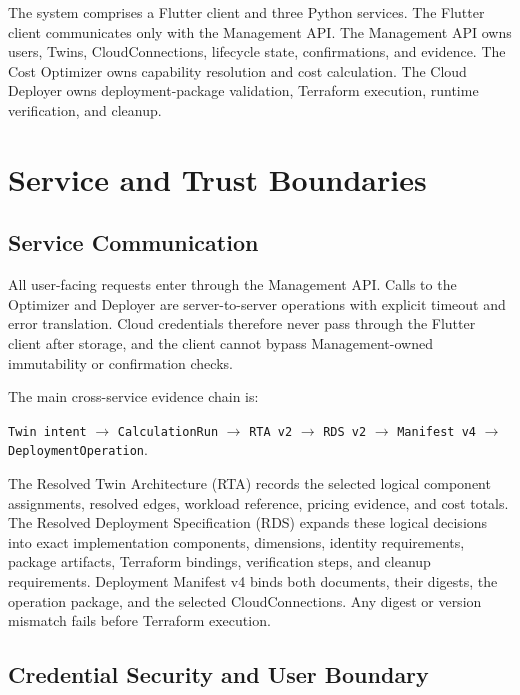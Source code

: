 The system comprises a Flutter client and three Python services. The Flutter
client communicates only with the Management API. The Management API owns
users, Twins, CloudConnections, lifecycle state, confirmations, and evidence.
The Cost Optimizer owns capability resolution and cost calculation. The Cloud
Deployer owns deployment-package validation, Terraform execution, runtime
verification, and cleanup.

\section{Service and Trust Boundaries}
\label{sec:microservices}

\subsection{Service Communication}
\label{sec:comm-patterns}

All user-facing requests enter through the Management API. Calls to the
Optimizer and Deployer are server-to-server operations with explicit timeout
and error translation. Cloud credentials therefore never pass through the
Flutter client after storage, and the client cannot bypass Management-owned
immutability or confirmation checks.

The main cross-service evidence chain is:

\begin{center}
\texttt{Twin intent} $\rightarrow$ \texttt{CalculationRun}
$\rightarrow$ \texttt{RTA v2} $\rightarrow$ \texttt{RDS v2}
$\rightarrow$ \texttt{Manifest v4} $\rightarrow$
\texttt{DeploymentOperation}.
\end{center}

The Resolved Twin Architecture (RTA) records the selected logical component
assignments, resolved edges, workload reference, pricing evidence, and cost
totals. The Resolved Deployment Specification (RDS) expands these logical
decisions into exact implementation components, dimensions, identity
requirements, package artifacts, Terraform bindings, verification steps, and
cleanup requirements. Deployment Manifest v4 binds both documents, their
digests, the operation package, and the selected CloudConnections. Any digest
or version mismatch fails before Terraform execution.

\subsection{Credential Security and User Boundary}
\label{sec:credential-security}

